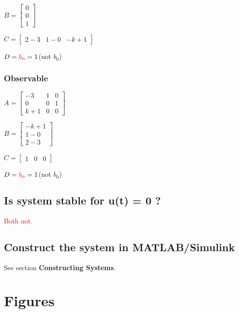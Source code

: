 \documentclass[12pt,a4paper,oneside]{ctexart}
\begin{document}
    $B = \begin{bmatrix}
        0\\
        0\\
        1
    \end{bmatrix}$

    $C = \begin{bmatrix}
        2-3&1-0&-k+1
    \end{bmatrix}$

    $D = \textcolor{red}{b_n} = 1$(not $b_0$)

    \subsubsection*{Observable}
    $A = \begin{bmatrix}
        -3&1&0\\
        0&0&1\\
        k+1&0&0
    \end{bmatrix}$

    $B = \begin{bmatrix}
        -k+1\\
        1-0\\
        2-3
    \end{bmatrix}$

    $C = \begin{bmatrix}
        1&0&0
    \end{bmatrix}$

    $D = \textcolor{red}{b_n} = 1$(not $b_0$)

    \subsection{Is system stable for u(t) = 0 ?}
    \textcolor{red}{Both not.}
    \subsection{Construct the system in MATLAB/Simulink}
    See section \textbf{Constructing Systems}.

    \section{Figures}
\end{document}
